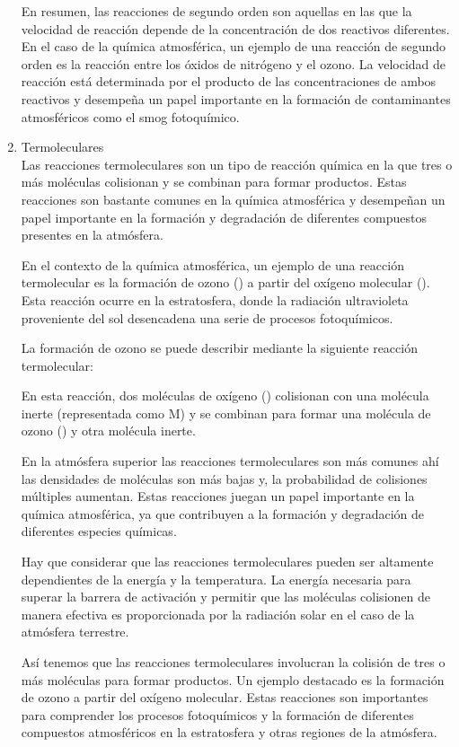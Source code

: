 \begin{enumerate}
En resumen, las reacciones de segundo orden son aquellas en las que la velocidad de reacción depende de la concentración de dos reactivos diferentes. En el caso de la química atmosférica, un ejemplo de una reacción de segundo orden es la reacción entre los óxidos de nitrógeno y el ozono. La velocidad de reacción está determinada por el producto de las concentraciones de ambos reactivos y desempeña un papel importante en la formación de contaminantes atmosféricos como el smog fotoquímico.

\item Termoleculares \\
Las reacciones termoleculares son un tipo de reacción química en la que tres o más moléculas colisionan y se combinan para formar productos. Estas reacciones son bastante comunes en la química atmosférica y desempeñan un papel importante en la formación y degradación de diferentes compuestos presentes en la atmósfera.

En el contexto de la química atmosférica, un ejemplo de una reacción termolecular es la formación de ozono () a partir del oxígeno molecular (). Esta reacción ocurre en la estratosfera, donde la radiación ultravioleta proveniente del sol desencadena una serie de procesos fotoquímicos.

La formación de ozono se puede describir mediante la siguiente reacción termolecular:


En esta reacción, dos moléculas de oxígeno () colisionan con una molécula inerte (representada como M) y se combinan para formar una molécula de ozono () y otra molécula inerte.

En la atmósfera superior las reacciones termoleculares son más comunes  ahí las densidades de moléculas son más bajas y,  la probabilidad de colisiones múltiples aumentan. Estas reacciones juegan un papel importante en la química atmosférica, ya que contribuyen a la formación y degradación de diferentes especies químicas.

Hay que considerar que las reacciones termoleculares pueden ser altamente dependientes de la energía y la temperatura. La energía necesaria para superar la barrera de activación y permitir que las moléculas colisionen de manera efectiva es proporcionada por la radiación solar en el caso de la atmósfera terrestre.

Así tenemos que las reacciones termoleculares involucran la colisión de tres o más moléculas para formar productos. Un ejemplo destacado es la formación de ozono a partir del oxígeno molecular. Estas reacciones son importantes para comprender los procesos fotoquímicos y la formación de diferentes compuestos atmosféricos en la estratosfera y otras regiones de la atmósfera.


\end{enumerate}
